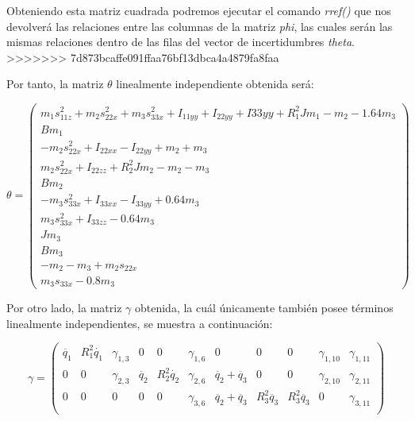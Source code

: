 		Obteniendo esta matriz cuadrada podremos ejecutar el comando \textit{rref()} que nos devolverá las relaciones entre las columnas de la matriz \textit{phi}, las cuales serán las mismas relaciones dentro de las filas del vector de incertidumbres \textit{theta}.\\
>>>>>>> 7d873bcaffe091ffaa76bf13dbca4a4879fa8faa

Por tanto, la matriz $\theta$ linealmente independiente obtenida será:

\[
\theta=
\begin{pmatrix}
m_{1}s_{11z}^{2} + m_{2}s_{22x}^{2} + m_{3}s_{33x}^{2} + I_{11yy} + I_{22yy} + I{33yy} + R_{1}^{2}Jm_1 - m_2 - 1.64m_3 \\

Bm_{1}  \\

-m_{2}s_{22x}^{2} + I_{22xx} - I_{22yy} + m_{2} + m_{3} \\

m_{2}s_{22x}^{2} + I_{22zz} + R_{2}^{2}Jm_{2} - m_{2} - m_{3}  \\

Bm_{2} \\

- m_{3}s_{33x}^{2} + I_{33xx} - I_{33yy} + 0.64m_{3} \\

m_{3}s_{33x}^{2} + I_{33zz} - 0.64m_{3}  \\

Jm_{3}  \\

Bm_{3}  \\

-m_{2} -m_{3} + m_{2}s_{22x}  \\

m_{3}s_{33x} - 0.8m_{3}
\end{pmatrix}\]



\vspace{1cm}

Por otro lado, la matriz $\gamma$ obtenida, la cuál únicamente también posee términos linealmente independientes, se muestra a continuación:

\[
\gamma=
\begin{pmatrix}
\ddot{q_1} & R_{1}^{2}\dot{q_1} & \gamma_{1,3} & 0 & 0  & \gamma_{1,6} & 0 & 0 & 0 & \gamma_{1,10} & \gamma_{1,11} \\

0 & 0 & \gamma_{2,3} & \ddot{q_2} & R_{2}^{2}\dot{q_2} & \gamma_{2,6} & \ddot{q_2} + \ddot{q_3} & 0 & 0 & \gamma_{2,10} & \gamma_{2,11} \\

0 & 0 & 0 & 0 & 0 & \gamma_{3,6} & \ddot{q_2} + \ddot{q_3} & R_{3}^{2}\ddot{q_3} & R_{3}^{2}\ddot{q_3} & 0 & \gamma_{3,11} \\
\end{pmatrix} \] \vspace{0.3cm}



